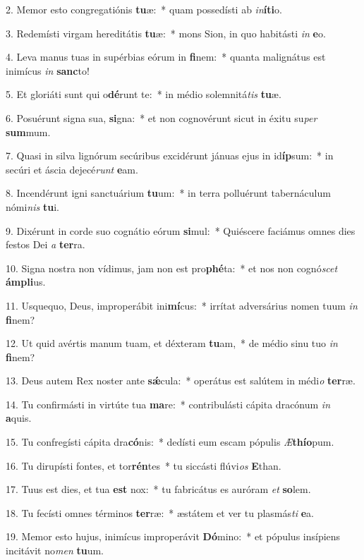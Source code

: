 2. Memor esto congregatiónis \textbf{tu}æ:~*  quam possedísti ab \textit{in}\textbf{í}\textbf{ti}o.\

3. Redemísti virgam hereditátis \textbf{tu}æ:~*  mons Sion, in quo habitásti \textit{in} \textbf{e}o.\

4. Leva manus tuas in supérbias eórum in \textbf{fi}nem:~*  quanta malignátus est inimícus \textit{in} \textbf{sanc}to!\

5. Et gloriáti sunt qui o\textbf{dé}runt te:~*  in médio solemnitá\textit{tis} \textbf{tu}æ.\

6. Posuérunt signa sua, \textbf{si}gna:~*  et non cognovérunt sicut in éxitu su\textit{per} \textbf{sum}mum.\

7. Quasi in silva lignórum secúribus excidérunt jánuas ejus in id\textbf{íp}sum:~*  in secúri et áscia dejecé\textit{runt} \textbf{e}am.\

8. Incendérunt igni sanctuárium \textbf{tu}um:~*  in terra polluérunt tabernáculum nómi\textit{nis} \textbf{tu}i.\

9. Dixérunt in corde suo cognátio eórum \textbf{si}mul:~*  Quiéscere faciámus omnes dies festos Dei \textit{a} \textbf{ter}ra.\

10. Signa nostra non vídimus, jam non est pro\textbf{phé}ta:~*  et nos non cognó\textit{scet} \textbf{ám}\textbf{pli}us.\

11. Usquequo, Deus, improperábit ini\textbf{mí}cus:~*  irrítat adversárius nomen tuum \textit{in} \textbf{fi}nem?\

12. Ut quid avértis manum tuam, et déxteram \textbf{tu}am,~*  de médio sinu tuo \textit{in} \textbf{fi}nem?\

13. Deus autem Rex noster ante \textbf{sǽ}cula:~*  operátus est salútem in médi\textit{o} \textbf{ter}ræ.\

14. Tu confirmásti in virtúte tua \textbf{ma}re:~*  contribulásti cápita dracónum \textit{in} \textbf{a}quis.\

15. Tu confregísti cápita dra\textbf{có}nis:~*  dedísti eum escam pópulis \textit{Æ}\textbf{thí}\textbf{o}pum.\

16. Tu dirupísti fontes, et tor\textbf{rén}tes~*  tu siccásti flúvi\textit{os} \textbf{E}than.\

17. Tuus est dies, et tua \textbf{est} nox:~*  tu fabricátus es auróram \textit{et} \textbf{so}lem.\

18. Tu fecísti omnes términos \textbf{ter}ræ:~*  æstátem et ver tu plasmás\textit{ti} \textbf{e}a.\

19. Memor esto hujus, inimícus improperávit \textbf{Dó}mino:~*  et pópulus insípiens incitávit no\textit{men} \textbf{tu}um.\

